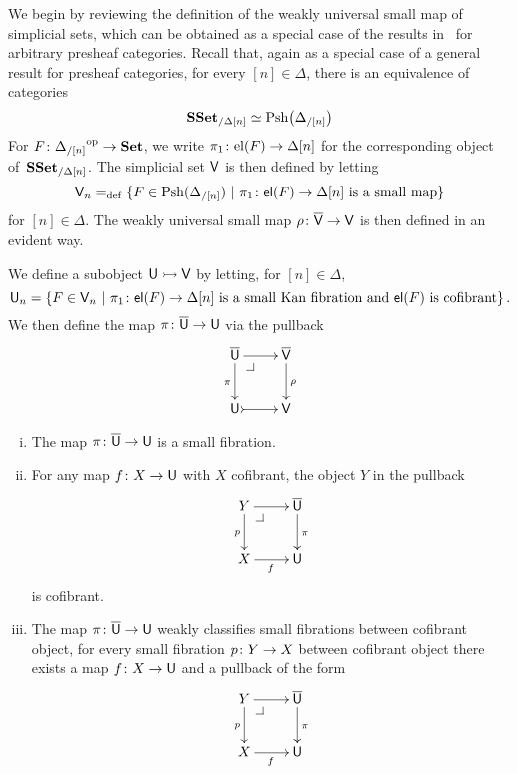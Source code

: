 \documentclass[reqno,10pt,a4paper,oneside,draft]{amsart}
\begin{document}
We begin by reviewing the definition of the weakly universal small map of simplicial sets, which
can be obtained as a special case of the results in~\cite{hofmann-streicher-universes} for arbitrary presheaf
categories. Recall that, again as a special case of a general result for presheaf categories, for every $[n] \in \Delta$, there is an equivalence of categories
\begin{equation}
\label{equ:pshslice}
\mathbf{SSet}_{/\Delta[n]} \simeq \mathrm{Psh} \big( \Delta_{/[n]} \big )
\end{equation}
For $F \colon {\Delta_{/[n]}}^{\operatorname{op}} \to \mathbf{Set}$, we write $\pi_1 \colon \mathrm{el}(F) \to \Delta[n]$
for the corresponding object of~$\mathbf{SSet}_{/\Delta[n]}$. The simplicial set $\mathsf{V}$ is then defined by letting
\[
\mathsf{V}_n =_{\operatorname{def}} \{ F \in \mathrm{Psh}(\Delta_{/[n]}) \ | \ \pi_1 \colon \mathsf{el}(F) \to \Delta[n] \text{ is a small
map} \}
\]
for $[n] \in \Delta$. The weakly universal small map $\rho \colon \overline{\mathsf{V}} \to \mathsf{V}$ is then defined in an evident way. 

\medskip

We define a subobject $\mathsf{U} \rightarrowtail \mathsf{V}$ by letting, for $[n] \in \Delta$, 
\[
\mathsf{U}_n = \{ F \in \mathsf{V}_n \ | \ \pi_1 \colon \mathsf{el}(F) \to \Delta[n] \text{ is a small Kan fibration and $\mathsf{el}(F)$ is cofibrant} \} \, .
\]
We then define the map $\pi \colon \overline{\mathsf{U}} \to \mathsf{U}$ via the pullback 
\[
\xymatrix{
\UU \ar[r] \ar[d]_\pi \drpullback  & \VV \ar[d]^\rho \\
\U \ar@{>->}[r] & \V }
\]




\begin{proposition} \label{thm:universe-u}  \hfill 
\begin{enumerate}[(i)] 
\item The map $\pi \colon \overline{\mathsf{U}} \to \mathsf{U}$ is a small fibration.
\item For any map $f \colon X \rightarrow \mathsf{U}$ with $X$ cofibrant, the object $Y$ in the pullback
\[
\xymatrix{
Y \ar[r] \ar[d]_p \drpullback & \UU \ar[d]^\pi \\
X \ar[r]_f & \U }
\]
is cofibrant.
\item The map $\pi \colon \overline{\mathsf{U}} \to \mathsf{U}$ weakly classifies small fibrations between cofibrant object, \ie 
for every small fibration $p \colon Y \to X$ between cofibrant object there exists a map $f \colon X \to \mathsf{U}$
and a pullback  of the form
\[
\xymatrix{
Y \ar[r] \ar[d]_p \drpullback & \UU \ar[d]^\pi \\
X \ar[r]_f & \U }
\]
\end{enumerate}
\end{proposition}
\end{document}
